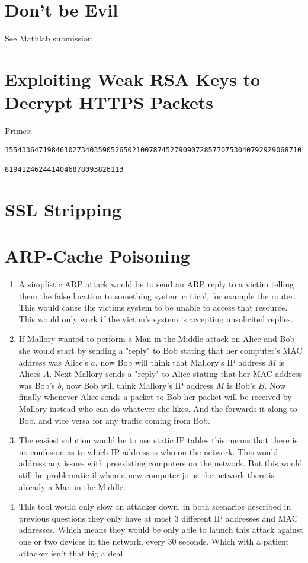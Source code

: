 \documentclass{article}
\begin{document}
\section{Don't be Evil}
See Mathlab submission
\section{Exploiting Weak RSA Keys to Decrypt HTTPS Packets}
Primes:\\
\begin{verbatim}
15543364719846102734035905265021007874527909072857707530407929290687101099950235380124854710034333308285660202980757696503925683873746491877865507719899027251207102262278680571817169261263452242836721127096300509656928177929591710741117876178047883330343700515792044255540432173197

8194124624414046878093826113
\end{verbatim}

\section{SSL Stripping}
\section{ARP-Cache Poisoning}
\begin{enumerate}[A]
	\item A simplistic ARP attack would be to send an ARP reply to a victim
		telling them the false location to something system critical, for
		example the router. This would cause the victims system to be unable to
		access that resource. This would only work if the victim's system is
		accepting unsolicited replies.
	\item If Mallory wanted to perform a Man in the Middle attack on Alice and
		Bob she would start by sending a "reply" to Bob stating that her
		computer's MAC address was Alice's $a$, now Bob will think that
		Mallory's IP address $M$ is Alices $A$. Next Mallory sends a "reply" to
		Alice stating that her MAC address was Bob's $b$, now Bob will think
		Mallory's IP address $M$ is Bob's $B$. Now finally whenever
		Alice sends a packet to Bob her packet will be received by Mallory
		instead who can do whatever she likes. And the forwards it along to Bob.
		and vice versa for any traffic coming from Bob.
	\item The easiest solution would be to use static IP tables this means that
		there is no confusion as to which IP address is who on the network. This
		would address any issues with preexisting computers on the network. But
		this would still be problematic if when a new computer joins the network
		there is already a Man in the Middle.
	\item This tool would only slow an attacker down, in both scenarios
		described in previous questions they only have at most 3 different IP
		addresses and MAC addresses. Which means they would be only able to
		launch this attack against one or two devices in the network, every 30
		seconds. Which with a patient attacker isn't that big a deal.
\end{enumerate}
\end{document}
